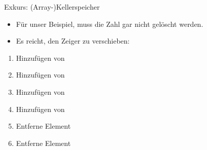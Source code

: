 \begin{frame}[fragile]{Exkurs: (Array-)Kellerspeicher}
    \begin{itemize}[<+(1)->]
        \item Für unser Beispiel, muss die Zahl gar nicht gelöscht werden.
        \item \strut Es reicht, den Zeiger zu verschieben:\smallskip\\
%
    \end{itemize}
    \begin{multicols}{3}
    \begin{enumerate}[<+(1)->]
        \item \strut Hinzufügen von \\ 
        \item \strut Hinzufügen von \\ 
        \item \strut Hinzufügen von \\ 
        \item \strut Hinzufügen von \\ 
        \item \strut Entferne Element\\ 
        \item \strut Entferne Element\\ 
    \end{enumerate}
    \end{multicols}
\end{frame}

